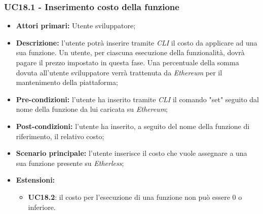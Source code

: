 \subsubsection{UC18.1 - Inserimento costo della funzione}
\begin{itemize}
	\item \textbf{Attori primari:} Utente sviluppatore;
	\item \textbf{Descrizione:} l'utente potrà inserire tramite \textit{CLI\glo} il costo da applicare ad una sua funzione. Un utente, per ciascuna esecuzione della funzionalità, dovrà pagare il prezzo impostato in questa fase. Una percentuale della somma dovuta all'utente sviluppatore verrà trattenuta da \textit{Ethereum\glo} per il mantenimento della piattaforma;
	\item \textbf{Pre-condizioni:} l'utente ha inserito tramite \textit{CLI\glo} il comando "set" seguito dal nome della funzione da lui caricata su \textit{Ethereum\glos};
	\item \textbf{Post-condizioni:} l'utente ha inserito, a seguito del nome della funzione di riferimento, il relativo costo;
	\item \textbf{Scenario principale:} l'utente inserisce il costo che vuole assegnare a una sua funzione presente su \textit{Etherless};
	\item \textbf{Estensioni:}
	\begin{itemize}
		\item \textbf{UC18.2}: il costo per l'esecuzione di una funzione non può essere 0 o inferiore.
	\end{itemize}
\end{itemize}
